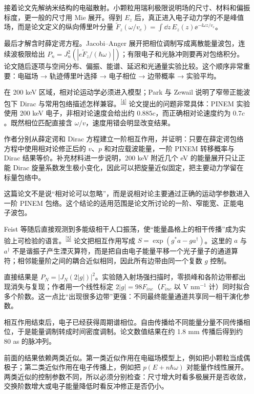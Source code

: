接着论文先解纳米结构的电磁散射。小颗粒用瑞利极限说明场的尺寸、材料和偏振标度，更一般的尺寸用 Mie 展开。得到 $E_z$ 后，真正进入电子动力学的不是峰值场，而是论文定义的纵向傅里叶分量 $\widetilde F_z(\omega/v_e)=\int \dd z\,E_z(z)\ee^{-\ii\omega z/v_e}$。

最后才解含时薛定谔方程。Jacobi--Anger 展开把相位调制写成离散能量波包，连续波极限给出 $P_n=J_n^2(|e\widetilde F_z/(\hbar\omega)|)$；有限电子和光脉冲则要再对包络积分。论文随后逐项与空间分布、偏振、能谱、延迟和光通量实验比较。这个顺序非常重要：电磁场 → 轨迹傅里叶选择 → 电子相位 → 边带概率 → 实验平均。


在 200 keV 区域，相对论运动学必须进入模型；Park 与 Zewail 说明了窄带正能波包下 Dirac 与常用包络描述怎样兼容。\textsuperscript{\hyperref[ch01-ref4]{[4]}}
论文提出的问题非常具体：PINEM 实验使用 200 keV 电子，非相对论速度会给出约 $0.885c$，而正确相对论速度约为 $0.7c$。既然相位匹配直接含 $\omega/v$，速度用错会明显改变结果。

作者分别从薛定谔和 Dirac 方程建立一阶相互作用，并证明：只要在薛定谔包络方程中使用相对论修正后的 $v$、$p$ 和对应载波能量，一阶 PINEM 转移概率与 Dirac 结果等价。补充材料进一步说明，200 keV 附近几个 eV 的能量展开只让正能 Dirac 旋量系数发生极小变化，因此可以把旋量近似固定，把主要动力学留在标量包络中。

这篇论文不是说“相对论可以忽略”，而是说相对论主要通过正确的运动学参数进入一阶 PINEM 包络。这个结论的适用范围是论文所讨论的一阶、窄能宽、正能电子波包。


Feist 等随后直接观测到多能级相干人口振荡，使“能量晶格上的相干传播”成为实验上可检验的语言。\textsuperscript{\hyperref[ch01-ref5]{[5]}}
论文把相互作用写成 $S=\exp(g^*a-ga^\dagger)$。这里的 $a$ 与 $a^\dagger$ 不是谐振子产生湮灭算符，而是把自由电子能量平移一个光子量子的通道算符；相邻能量阶之间的耦合近似相同，因此所有边带由同一个复数 $g$ 控制。

直接结果是 $P_N=|J_N(2|g|)|^2$。实验随入射场强扫描时，零损峰和各阶边带都出现消失与复现；作者用一个线性标定 $2|g|=98F_{inc}$（$F_{inc}$ 以 V nm$^{-1}$ 计）同时拟合多个阶数。这一点比“出现很多边带”更强：不同最终能量通道共享同一相干演化参数。

相互作用结束后，电子已经获得周期谱相位。自由传播给不同能量分量不同传播相位，于是能量调制转成时间密度调制。论文数值结果在约 1.8 mm 传播后得到约 80 as 的脉冲列。


前面的结果依赖两类近似。第一类近似作用在电磁场模型上，例如把小颗粒当成偶极子；第二类近似作用在电子传播上，例如把 $p(E+n\hbar\omega)$ 对能量作线性展开。两类近似的控制参数不同，所以必须分别检查：尺寸增大时看多极展开是否收敛，交换阶数增大或电子能量降低时看反冲修正是否仍小。

